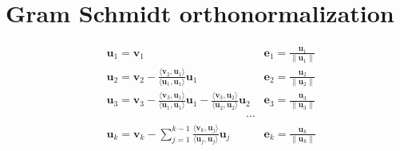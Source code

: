 \section*{Gram Schmidt orthonormalization }
\begin{align*}
    &\textbf{u}_1=\textbf{v}_1 &\textbf{e}_1=\frac{\textbf{u}_1}{\|\textbf{u}_1\|}\\
    &\textbf{u}_2=\textbf{v}_2- \frac{\langle \textbf{v}_2, \textbf{u}_1\rangle}{\langle \textbf{u}_1,\textbf{u}_1\rangle}\textbf{u}_1
    &\textbf{e}_2=\frac{\textbf{u}_2}{\|\textbf{u}_2\|}\\ 
    &\textbf{u}_3=\textbf{v}_3- \frac{\langle \textbf{v}_3, \textbf{u}_1\rangle}{\langle \textbf{u}_1,\textbf{u}_1\rangle}\textbf{u}_1 -
    \frac{\langle \textbf{v}_3, \textbf{u}_2\rangle}{\langle \textbf{u}_2,\textbf{u}_2\rangle}\textbf{u}_2 
    &\textbf{e}_3=\frac{\textbf{u}_3}{\|\textbf{u}_3\|}\\ 
    &\hspace{150pt}\cdots 
    &\\
    &\textbf{u}_k=\textbf{v}_k- \sum_{j=1}^{k-1} \frac{\langle \textbf{v}_k, \textbf{u}_j\rangle}{\langle \textbf{u}_j,\textbf{u}_j\rangle}\textbf{u}_j
    &\textbf{e}_k=\frac{\textbf{u}_k}{\|\textbf{u}_k\|}
\end{align*}
